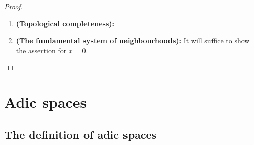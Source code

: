                     \begin{proof}
                        \noindent
                        \begin{enumerate}
                            \item \textbf{(Topological completeness):}
                            \item \textbf{(The fundamental system of neighbourhoods):} It will suffice to show the assertion for $x = 0$.
                        \end{enumerate}
                    \end{proof}
        
    \section{Adic spaces}
        \subsection{The definition of adic spaces}
